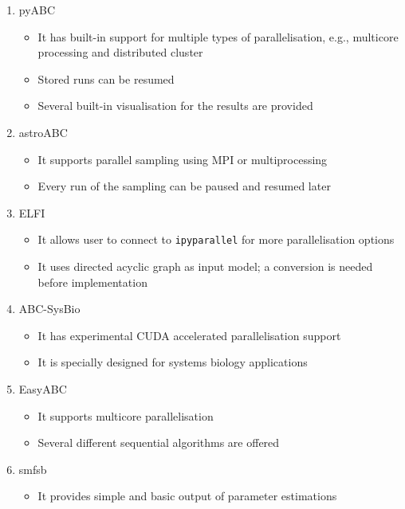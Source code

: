\documentclass{article}
\begin{document}
\begin{enumerate}
	\item pyABC
	\begin{itemize}
		\item It has built-in support for multiple types of parallelisation, e.g., 
		multicore processing and distributed cluster

		\item Stored runs can be resumed
		
		\item Several built-in visualisation for the results are provided
	\end{itemize}

	\item astroABC
	\begin{itemize}
		\item It supports parallel sampling using MPI or multiprocessing
		
		\item Every run of the sampling can be paused and resumed later
	\end{itemize}

	\item ELFI
	\begin{itemize}
		\item It allows user to connect to \texttt{ipyparallel} for more parallelisation options
		
		\item It uses directed acyclic graph as input model; a conversion is needed before implementation
	\end{itemize}

	\item ABC-SysBio
	\begin{itemize}
		\item It has experimental CUDA accelerated parallelisation support
		\item It is specially designed for systems biology applications
		
	\end{itemize}

	\item EasyABC
	\begin{itemize}
		\item It supports multicore parallelisation
		
		\item Several different sequential algorithms are offered
	\end{itemize}

	\item smfsb
	\begin{itemize}
		\item It provides simple and basic output of parameter estimations
	\end{itemize}

\end{enumerate}
\end{document}

